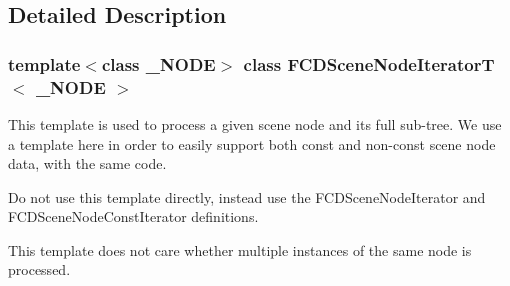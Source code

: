\subsection{Detailed Description}
\subsubsection*{template$<$class \_\-NODE$>$ class FCDSceneNodeIteratorT$<$ \_\-NODE $>$}

This template is used to process a given scene node and its full sub-\/tree. We use a template here in order to easily support both const and non-\/const scene node data, with the same code.

Do not use this template directly, instead use the FCDSceneNodeIterator and FCDSceneNodeConstIterator definitions.

This template does not care whether multiple instances of the same node is processed. 


